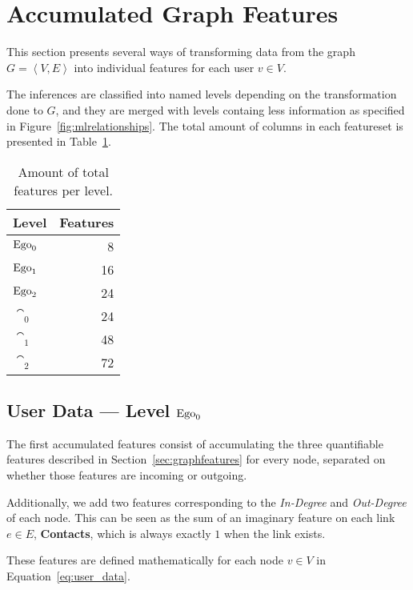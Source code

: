 \section{Accumulated Graph Features}
\label{sec:accumulatedfeatures}

This section presents several ways of transforming data from the graph $G = \left< V, E \right>$ into individual features for each user $v \in V$.

The inferences are classified into named levels depending on the transformation done to $G$, and they are merged with levels containg less information as specified in Figure~\ref{fig:mlrelationships}. The total amount of columns in each featureset is presented in Table~\ref{tab:features}.

\begin{table}
\centering
\begin{tabular}{>{\bfseries}l r}
\toprule
Level & Features \\
\midrule
$\operatorname{Ego}_0$ & \num{8}  \\
$\operatorname{Ego}_1$ & \num{16} \\
$\operatorname{Ego}_2$ & \num{24} \\
$\cat_0$ & \num{24} \\
$\cat_1$ & \num{48} \\
$\cat_2$ & \num{72} \\
\bottomrule
\end{tabular}
\caption{Amount of total features per level.}
\label{tab:features}
\end{table}

\subsection{User Data --- Level $\operatorname{Ego}_0$}
\label{subsec:user_data}

The first accumulated features consist of accumulating the three quantifiable features described in Section~\ref{sec:graphfeatures} for every node, separated on whether those features are incoming or outgoing.

Additionally, we add two features corresponding to the \emph{In-Degree} and \emph{Out-Degree} of each node. This can be seen as the sum of an imaginary feature on each link $e \in E$, \textbf{Contacts}, which is always exactly $1$ when the link exists.

These features are defined mathematically for each node $v \in V$ in Equation~\ref{eq:user_data}.

